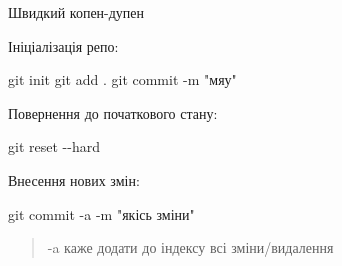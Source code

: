 \documentclass[
  ignorenonframetext,
  aspectratio=169,
]{beamer}
\newenvironment{Shaded}{}{}
\newcommand{\AttributeTok}[1]{\textcolor[rgb]{0.49,0.56,0.16}{#1}}
\newcommand{\FunctionTok}[1]{\textcolor[rgb]{0.02,0.16,0.49}{#1}}
\newcommand{\NormalTok}[1]{#1}
\newcommand{\StringTok}[1]{\textcolor[rgb]{0.25,0.44,0.63}{#1}}
\begin{document}
\begin{frame}[fragile]{Швидкий копен-дупен}
\protect\hypertarget{ux448ux432ux438ux434ux43aux438ux439-ux43aux43eux43fux435ux43d-ux434ux443ux43fux435ux43d}{}
\begin{block}{Ініціалізація репо:}
\protect\hypertarget{ux456ux43dux456ux446ux456ux430ux43bux456ux437ux430ux446ux456ux44f-ux440ux435ux43fux43e}{}
\begin{Shaded}
\begin{Highlighting}[]
\FunctionTok{git}\NormalTok{ init}
\FunctionTok{git}\NormalTok{ add .}
\FunctionTok{git}\NormalTok{ commit }\AttributeTok{{-}m} \StringTok{"мяу"}
\end{Highlighting}
\end{Shaded}

\pause
\end{block}

\begin{block}{Повернення до початкового стану:}
\protect\hypertarget{ux43fux43eux432ux435ux440ux43dux435ux43dux43dux44f-ux434ux43e-ux43fux43eux447ux430ux442ux43aux43eux432ux43eux433ux43e-ux441ux442ux430ux43dux443}{}
\begin{Shaded}
\begin{Highlighting}[]
\FunctionTok{git}\NormalTok{ reset }\AttributeTok{{-}{-}hard}
\end{Highlighting}
\end{Shaded}

\pause
\end{block}

\begin{block}{Внесення нових змін:}
\protect\hypertarget{ux432ux43dux435ux441ux435ux43dux43dux44f-ux43dux43eux432ux438ux445-ux437ux43cux456ux43d}{}
\begin{Shaded}
\begin{Highlighting}[]
\FunctionTok{git}\NormalTok{ commit }\AttributeTok{{-}a} \AttributeTok{{-}m} \StringTok{"якісь зміни"}
\end{Highlighting}
\end{Shaded}

\begin{quote}
-a каже додати до індексу всі зміни/видалення
\end{quote}
\end{block}
\end{frame}
\end{document}
